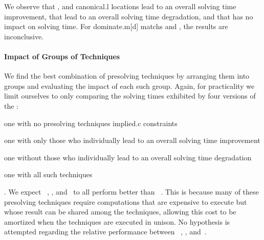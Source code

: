 We observe that , and
\gls{canonical.l} \glspl{location} lead to an overall solving time improvement,
that  lead
to an overall solving time degradation, and that
 has no impact on solving time.
%
For \gls{dominate.m}[d] \glspl{match} and
, the
results are inconclusive.


\paragraph{Impact of Groups of Techniques}

We find the best combination of \gls{presolving} techniques by arranging them
into groups and evaluating the impact of each such group.
%
Again, for practicality we limit ourselves to only comparing the solving times
exhibited by four versions of the :
%
\begin{modelList}
  \item {}
    one with no \gls{presolving} techniques
\gls{implied.c} \glspl{constraint}
  \item {}
    one with only those who individually lead to an overall solving time
    improvement
  \item {}
    one without those who individually lead to an overall solving time
    degradation
  \item {}
    one with all such techniques
\end{modelList}.
%
We expect ~,
, and~ to all perform
better than ~.
%
This is because many of these \gls{presolving} techniques require computations
that are expensive to execute but whose result can be shared among the
techniques, allowing this cost to be amortized when the techniques are executed
in unison.
%
No hypothesis is attempted regarding the relative performance between
~,
, and~.


